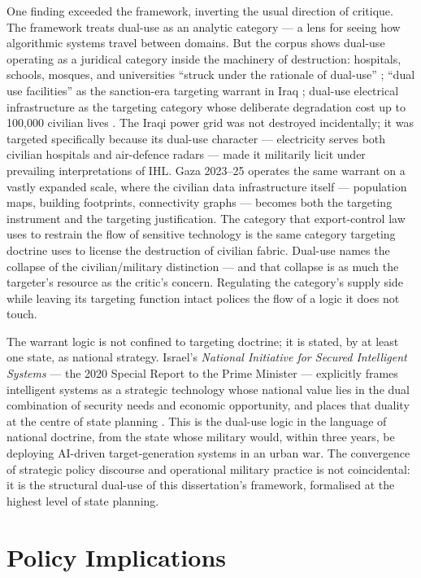 One finding exceeded the framework, inverting the usual direction of critique. The framework treats dual-use as an analytic category — a lens for seeing how algorithmic systems travel between domains. But the corpus shows dual-use operating as a juridical category inside the machinery of destruction: hospitals, schools, mosques, and universities ``struck under the rationale of dual-use'' \parencite[p.~406]{benguita2025}; ``dual use facilities'' as the sanction-era targeting warrant in Iraq \parencite[p.~406]{coward2009}; dual-use electrical infrastructure as the targeting category whose deliberate degradation cost up to 100,000 civilian lives \parencite[p.~355]{graham2011}. The Iraqi power grid was not destroyed incidentally; it was targeted specifically because its dual-use character — electricity serves both civilian hospitals and air-defence radars — made it militarily licit under prevailing interpretations of IHL. Gaza 2023–25 operates the same warrant on a vastly expanded scale, where the civilian data infrastructure itself — population maps, building footprints, connectivity graphs — becomes both the targeting instrument and the targeting justification. The category that export-control law uses to restrain the flow of sensitive technology is the same category targeting doctrine uses to license the destruction of civilian fabric. Dual-use names the collapse of the civilian/military distinction — and that collapse is as much the targeter's resource as the critic's concern. Regulating the category's supply side while leaving its targeting function intact polices the flow of a logic it does not touch.

The warrant logic is not confined to targeting doctrine; it is stated, by at least one state, as national strategy. Israel's \emph{National Initiative for Secured Intelligent Systems} — the 2020 Special Report to the Prime Minister — explicitly frames intelligent systems as a strategic technology whose national value lies in the dual combination of security needs and economic opportunity, and places that duality at the centre of state planning \parencite{benisrael2020}. This is the dual-use logic in the language of national doctrine, from the state whose military would, within three years, be deploying AI-driven target-generation systems in an urban war. The convergence of strategic policy discourse and operational military practice is not coincidental: it is the structural dual-use of this dissertation's framework, formalised at the highest level of state planning.

\section{Policy Implications}
\label{sec:policy-implications}

